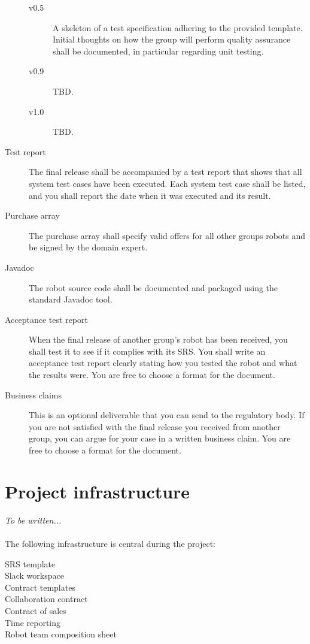 \documentclass{scrreprt}
\begin{document}
\begin{description}
\begin{description}
\item[v0.5] A skeleton of a test specification adhering to the provided template. Initial thoughts on how the group will perform quality assurance shall be documented, in particular regarding unit testing.
\item[v0.9] TBD.
\item[v1.0] TBD.
\end{description}
\item[Test report] The final release shall be accompanied by a test report that shows that all system test cases have been executed. Each system test case shall be listed, and you shall report the date when it was executed and its result.
\item[Purchase array] The purchase array shall specify valid offers for all other groups robots and be signed by the domain expert.
\item[Javadoc] The robot source code shall be documented and packaged using the standard Javadoc tool.
\item[Acceptance test report] When the final release of another group's robot has been received, you shall test it to see if it complies with its SRS. You shall write an acceptance test report clearly stating how you tested the robot and what the results were. You are free to choose a format for the document.
\item[Business claims] This is an optional deliverable that you can send to the regulatory body. If you are not satisfied with the final release you received from another group, you can argue for your case in a written business claim. You are free to choose a format for the document. 
\end{description}

\section{Project infrastructure}
\emph{To be written...}\\\\
The following infrastructure is central during the project:

\begin{description}
\item[SRS template]
\item[Slack workspace]
\item[Contract templates]
\item[Collaboration contract]
\item[Contract of sales]
\item[Time reporting]
\item[Robot team composition sheet]
\end{description}
\end{document}
